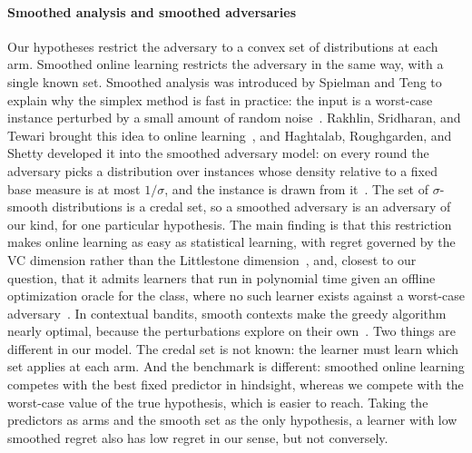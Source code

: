 {\paragraph{Smoothed analysis and smoothed adversaries} Our hypotheses restrict the adversary to a convex set of distributions at each arm. Smoothed online learning restricts the adversary in the same way, with a single known set. Smoothed analysis was introduced by Spielman and Teng to explain why the simplex method is fast in practice: the input is a worst-case instance perturbed by a small amount of random noise~\citep{spielman2004smoothed}. Rakhlin, Sridharan, and Tewari brought this idea to online learning~\citep{rakhlin2011online}, and Haghtalab, Roughgarden, and Shetty developed it into the smoothed adversary model: on every round the adversary picks a distribution over instances whose density relative to a fixed base measure is at most $1/\sigma$, and the instance is drawn from it~\citep{haghtalab2020smoothed,haghtalab2024smoothed}. The set of $\sigma$-smooth distributions is a credal set, so a smoothed adversary is an adversary of our kind, for one particular hypothesis. The main finding is that this restriction makes online learning as easy as statistical learning, with regret governed by the VC dimension rather than the Littlestone dimension~\citep{block2022smoothed}, and, closest to our question, that it admits learners that run in polynomial time given an offline optimization oracle for the class, where no such learner exists against a worst-case adversary~\citep{haghtalab2022oracle}. In contextual bandits, smooth contexts make the greedy algorithm nearly optimal, because the perturbations explore on their own~\citep{kannan2018smoothed,raghavan2023greedy}. Two things are different in our model. The credal set is not known: the learner must learn which set applies at each arm. And the benchmark is different: smoothed online learning competes with the best fixed predictor in hindsight, whereas we compete with the worst-case value of the true hypothesis, which is easier to reach. Taking the predictors as arms and the smooth set as the only hypothesis, a learner with low smoothed regret also has low regret in our sense, but not conversely.
}

